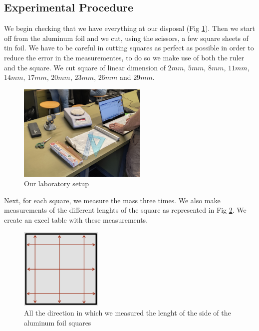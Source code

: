 \documentclass[a4paper,12pt]{article}
\begin{document}
\subsection{Experimental Procedure}
We begin checking that we have everything at our disposal (Fig \ref{fig:lab_instr}).
Then we start off from the aluminum foil and we cut, using the scissors, a few square sheets of tin foil. 
We have to be careful in cutting squares as perfect as possible in order to reduce the error in 
the measurementes, to do so we make use of both the ruler and the square. We cut square of linear 
dimension of $2mm$, $5mm$, $8mm$, $11mm$, $14mm$, $17mm$, $20mm$, $23mm$, $26mm$ and $29mm$.

\begin{figure}[h]
    \centering
    \includegraphics[width = 0.55\textwidth]{Lab_instruments.jpg}
    \caption{Our laboratory setup}
    \label{fig:lab_instr}
\end{figure}

Next, for each square, we measure the mass three times. We also make measurements of the different 
lenghts of the square as represented in Fig \ref{fig:sq_measure}. We create an excel table with 
these measurements.

\begin{figure}[h]
    \centering
    \includegraphics[width = 0.35\textwidth]{square_measure.png}
    \caption{All the direction in which we measured the lenght of the side of the aluminum foil squares}
    \label{fig:sq_measure}
\end{figure}
\end{document}
